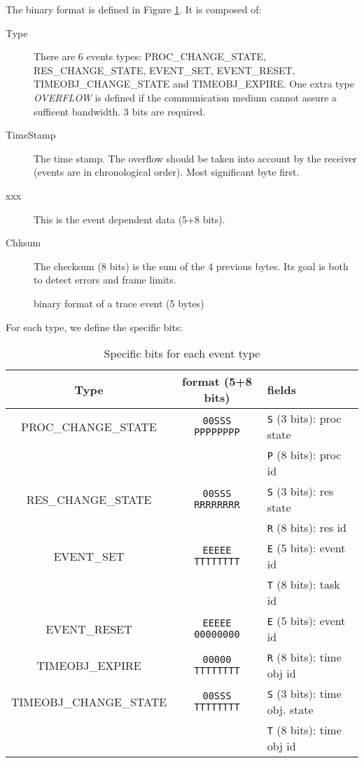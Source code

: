 The binary format is defined in Figure \ref{fig:traceBin}. It is composed of:
\begin{description}
	\item[Type] There are 6 events types: PROC\_CHANGE\_STATE, RES\_CHANGE\_STATE, EVENT\_SET, EVENT\_RESET, TIMEOBJ\_CHANGE\_STATE and TIMEOBJ\_EXPIRE. One extra type \emph{OVERFLOW} is defined if the communication medium cannot assure a sufficent bandwidth. 3 bits are required.
	\item[TimeStamp] The time stamp. The overflow should be taken into account by the receiver (events are in chronological order). Most significant byte first.
	\item[xxx] This is the event dependent data (5+8 bits).
	\item[Chksum] The checksum (8 bits) is the sum of the 4 previous bytes. Its goal is both to detect errors and frame limits.
\end{description}

\begin{figure}[htbp]
    \centering
	\begin{adjustbox}{width=.8\linewidth,keepaspectratio}
		
	\end{adjustbox}
	\caption{binary format of a trace event (5 bytes)}
	\label{fig:traceBin}
\end{figure}

For each type, we define the specific bits:

\begin{table}[htbp]
	\begin{longtable}[c]{c|c|l}
		\bf Type & \bf format (5+8 bits) & \bf fields \\ \hline
		PROC\_CHANGE\_STATE    & \texttt{00SSS PPPPPPPP}& \texttt{S} (3 bits): proc state \\
		                       &                        & \texttt{P} (8 bits): proc id    \\ \hline
		RES\_CHANGE\_STATE     & \texttt{00SSS RRRRRRRR}& \texttt{S} (3 bits): res state  \\
		                       &                        & \texttt{R} (8 bits): res id     \\ \hline
		EVENT\_SET             & \texttt{EEEEE TTTTTTTT}& \texttt{E} (5 bits): event id   \\
		                       &                        & \texttt{T} (8 bits): task id     \\ \hline
		EVENT\_RESET           & \texttt{EEEEE 00000000}& \texttt{E} (5 bits): event id   \\ \hline
		TIMEOBJ\_EXPIRE        & \texttt{00000 TTTTTTTT}& \texttt{R} (8 bits): time obj id    \\ \hline
		TIMEOBJ\_CHANGE\_STATE & \texttt{00SSS TTTTTTTT}& \texttt{S} (3 bits): time obj. state \\
		                       &                        & \texttt{T} (8 bits): time obj id    \\ \hline
	\end{longtable}
	\caption{Specific bits for each event type}
	\label{tab:traceBin}
\end{table}

